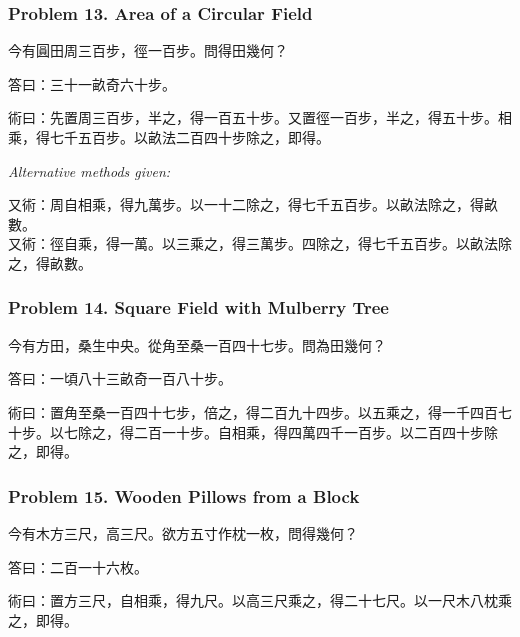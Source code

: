 \documentclass[11pt,a4paper]{article}
\newcommand{\zh}[1]{{\CJKfamily{}#1}}
\begin{document}
\subsubsection*{Problem 13. Area of a Circular Field}

\begin{problembox}[title=\zh{問}]
\zh{今有圓田周三百步，徑一百步。問得田幾何？}
\end{problembox}
\begin{answerbox}[title=\zh{答}]
\zh{答曰：三十一畝奇六十步。}
\end{answerbox}
\begin{methodbox}[title=\zh{術}]
\zh{術曰：先置周三百步，半之，得一百五十步。又置徑一百步，半之，得五十步。相乘，得七千五百步。以畝法二百四十步除之，即得。}
\end{methodbox}

\textit{Alternative methods given:}

\begin{methodbox}[title=\zh{又術}]
\zh{又術：周自相乘，得九萬步。以一十二除之，得七千五百步。以畝法除之，得畝數。\\
又術：徑自乘，得一萬。以三乘之，得三萬步。四除之，得七千五百步。以畝法除之，得畝數。}
\end{methodbox}

\subsubsection*{Problem 14. Square Field with Mulberry Tree}

\begin{problembox}[title=\zh{問}]
\zh{今有方田，桑生中央。從角至桑一百四十七步。問為田幾何？}
\end{problembox}
\begin{answerbox}[title=\zh{答}]
\zh{答曰：一頃八十三畝奇一百八十步。}
\end{answerbox}
\begin{methodbox}[title=\zh{術}]
\zh{術曰：置角至桑一百四十七步，倍之，得二百九十四步。以五乘之，得一千四百七十步。以七除之，得二百一十步。自相乘，得四萬四千一百步。以二百四十步除之，即得。}
\end{methodbox}

\subsubsection*{Problem 15. Wooden Pillows from a Block}

\begin{problembox}[title=\zh{問}]
\zh{今有木方三尺，高三尺。欲方五寸作枕一枚，問得幾何？}
\end{problembox}
\begin{answerbox}[title=\zh{答}]
\zh{答曰：二百一十六枚。}
\end{answerbox}
\begin{methodbox}[title=\zh{術}]
\zh{術曰：置方三尺，自相乘，得九尺。以高三尺乘之，得二十七尺。以一尺木八枕乘之，即得。}
\end{methodbox}
\end{document}
